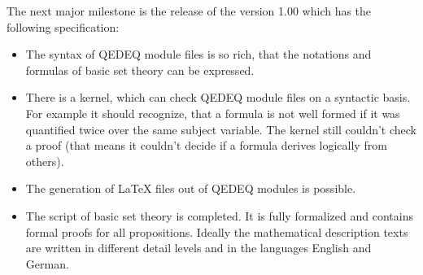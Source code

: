 \documentclass[a4paper,german,10pt,twoside]{book}
\theoremstyle{definition}
\theoremstyle{remark}
\begin{document}
\par
The next major milestone is the release of the version 1.00 which has the following specification:
\begin{itemize}
\item
The syntax of QEDEQ module files is so rich, that the notations and formulas of basic set theory can be expressed.
\item
There is a kernel, which can check QEDEQ module files on a syntactic basis. For example it should recognize, that a formula is not well formed if it was quantified twice over the same subject variable. The kernel still couldn't check a proof (that means it couldn't decide if a formula derives logically from others).
\item
The generation of \LaTeX{} files out of QEDEQ modules is possible.
\item
The script of basic set theory is completed. It is fully formalized and contains formal proofs for all propositions. Ideally the mathematical description texts are written in different detail levels and in the languages English and German.
\end{itemize}


\backmatter

 \printindex
\end{document}
